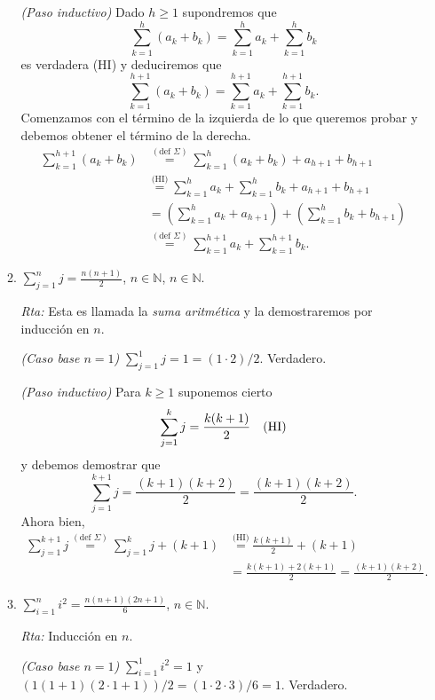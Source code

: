 \documentclass[a4paper,12pt,twoside,spanish,reqno]{amsbook}
\numberwithin{equation}{section}
\newcommand{\rta}{\noindent\textit{Rta: }}
\begin{document}
\begin{enumerate}
\begin{enumerate}
            \textit{(Paso inductivo) } Dado $h \ge 1$ supondremos  que 
            $$\sum_{k=1}^h (a_k + b_k) = \sum_{k=1}^h a_k + \sum_{k=1}^h b_k$$ es verdadera (HI) y deduciremos que $$\sum_{k=1}^{h+1} (a_k + b_k) = \sum_{k=1}^{h+1} a_k + \sum_{k=1}^{h+1} b_k.$$
            Comenzamos con el término de la izquierda de lo que queremos probar  y debemos obtener el término de la derecha. 
            \begin{align*}
                \sum_{k=1}^{h+1} (a_k + b_k) &\overset{(\text{def } \Sigma)}{=}  \sum_{k=1}^h (a_k + b_k) + a_{h+1} + b_{h+1}\\ &\overset{\text{(HI)}}{=} \sum_{k=1}^h a_k + \sum_{k=1}^h b_k + a_{h+1} + b_{h+1}
                \\&= ( \sum_{k=1}^h a_k+a_{h+1} ) + ( \sum_{k=1}^h b_k + b_{h+1}) \\&\overset{(\text{def } \Sigma)}{=} \sum_{k=1}^{h+1} a_k + \sum_{k=1}^{h+1} b_k.
            \end{align*}
            
            
            \item\label{ej-serie-aritmetica}  $\displaystyle{ \sum_{j=1}^n j = \frac{n(n+1)}{2}}$, $n\in \mathbb N$, $n\in \mathbb N$.
            
            \rta Esta es llamada la \textit{suma aritmética} y la demostraremos por inducción en $n$.
            
            \textit{(Caso base $n=1$) } $ \sum_{j=1}^1 j = 1 = (1 \cdot 2)/2$. Verdadero. 
            
            \textit{(Paso inductivo) } Para $k \ge 1$ suponemos cierto $$\sum_{j=1}^k j = \frac{k(k+1)}{2} \text{\quad (HI)}$$  y  debemos demostrar  que $$\sum_{j=1}^{k+1} j = \frac{(k+1)(k+2)}{2} = \frac{(k+1)(k+2)}{2}.$$ Ahora bien,
            \begin{align*}
                \sum_{j=1}^{k+1} j \overset{(\text{def } \Sigma)}{=} \sum_{j=1}^k j + (k+1)&  \overset{\text{(HI)}}{=} \frac{k(k+1)}{2} + (k+1) \\&= \frac{k(k+1) +2(k+1)}{2} = \frac{(k+1)(k +2)}{2}. 
            \end{align*}
            
            \item\label{ej-sum-i2}  $\displaystyle{ \sum_{i=1}^n i^2 = \frac{n(n+1)(2n+1)}{6}}$, $n\in \mathbb N$.
            
            \rta Inducción en $n$.
            
            \textit{(Caso base $n=1$) } $ \sum_{i=1}^1 i^2 = 1$ y $(1  (1+1)  (2\cdot 1 + 1))/2 = (1 \cdot 2 \cdot 3)/6=1$. Verdadero.  
            

\end{enumerate}
\end{enumerate}
\end{document}
